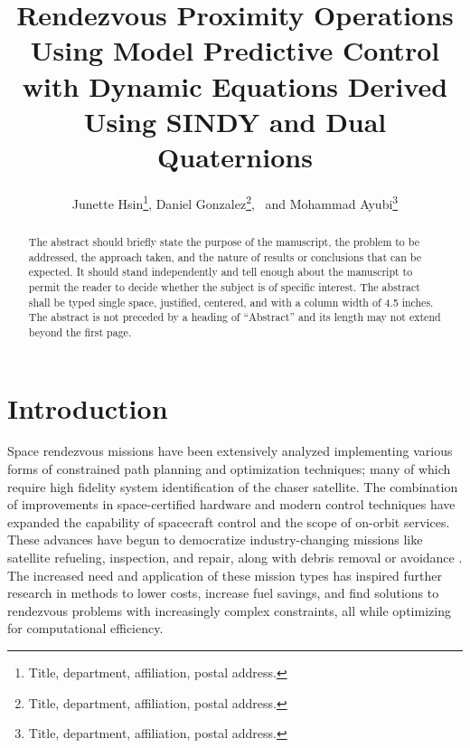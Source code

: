 \documentclass[letterpaper, preprint, paper,11pt]{AAS}	%
\begin{document}
\title{Rendezvous Proximity Operations Using Model Predictive Control with Dynamic Equations Derived Using SINDY and Dual Quaternions}

\author{Junette Hsin\thanks{Title, department, affiliation, postal address.},  
Daniel Gonzalez\thanks{Title, department, affiliation, postal address.},
\ and Mohammad Ayubi\thanks{Title, department, affiliation, postal address.}
}


\maketitle{} 		


\begin{abstract}
	
The abstract should briefly state the purpose of the manuscript, the problem to be addressed, the approach taken, and the nature of results or conclusions that can be expected. It should stand independently and tell enough about the manuscript to permit the reader to decide whether the subject is of specific interest. The abstract shall be typed single space, justified, centered, and with a column width of 4.5 inches. The abstract is not preceded by a heading of ``Abstract'' and its length may not extend beyond the first page.

\end{abstract}








\section{Introduction}
%

Space rendezvous missions have been extensively analyzed implementing various forms of constrained path planning and optimization techniques; many of which require high fidelity system identification of the chaser satellite. The combination of improvements in space-certified hardware and modern control techniques have expanded the capability of spacecraft control and the scope of on-orbit services. These advances have begun to democratize industry-changing missions like satellite refueling, inspection, and repair, along with debris removal or avoidance \cite{ParkZagaris_AnalysisandExperimention,cairano_park_MPC}. The increased need and application of these mission types has inspired further research in methods to lower costs, increase fuel savings, and find solutions to rendezvous problems with increasingly complex constraints, all while optimizing for computational efficiency.
\end{document}
